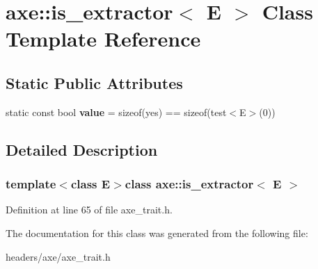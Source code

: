 \hypertarget{classaxe_1_1is__extractor}{\section{axe\+:\+:is\+\_\+extractor$<$ E $>$ Class Template Reference}
\label{classaxe_1_1is__extractor}
}
\subsection*{Static Public Attributes}
\begin{DoxyCompactItemize}
\item 
\hypertarget{classaxe_1_1is__extractor_a3d98f1e10e0c106424e6b7de06764430}{static const bool {\bfseries value} = sizeof(yes) == sizeof(test$<$E$>$(0))}\label{classaxe_1_1is__extractor_a3d98f1e10e0c106424e6b7de06764430}

\end{DoxyCompactItemize}


\subsection{Detailed Description}
\subsubsection*{template$<$class E$>$class axe\+::is\+\_\+extractor$<$ E $>$}



Definition at line 65 of file axe\+\_\+trait.\+h.



The documentation for this class was generated from the following file\+:\begin{DoxyCompactItemize}
\item 
headers/axe/axe\+\_\+trait.\+h\end{DoxyCompactItemize}
